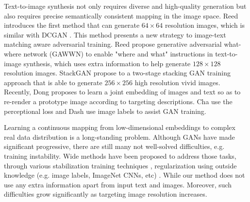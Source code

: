 \documentclass[10pt,twocolumn,letterpaper]{article}
\begin{document}
Text-to-image synthesis not only requires diverse and high-quality generation but also requires precise semantically consistent mapping in the image space.  Reed \etal \cite{reed2016generative} introduces the first method that can generate $64{\times}64$ resolution images, which is similar with DCGAN \cite{radford2015unsupervised}. This method presents a new strategy to image-text matching aware adversarial training. Reed \etal \cite{reed2016learning} propose generative
adversarial what-where network (GAWWN) to enable "where and what" instructions in text-to-image synthesis, which uses extra information to help generate $128{\times}128$ resolution images. StackGAN \etal \cite{han2017stackgan} propose to a two-stage stacking GAN training approach that is able to generate $256{\times}256$ high resolution vivid images. Recently, Dong \etal \cite{dong2017semantic} proposes to learn a joint embedding of images and text so as to re-render a prototype image according to targeting descriptions. Cha \etal \cite{dash2017tac} use the perceptional loss and Dash \etal \cite{dash2017tac} use image labels to assist GAN training. 
	
Learning a continuous mapping from low-dimensional embeddings to complex real data distribution is a long-standing problem. Although GANs have made significant progressive, there are still many not well-solved difficulties, e.g. training instability. Wide methods have been proposed to address those tasks, through various stabilization training techniques \cite{salimans2016improved,arjovsky2017wasserstein,berthelot2017began,shrivastava2016learning,odena2016conditional}, regularization using outside knowledge (e.g. image labels, ImageNet CNNs, etc) \cite{dosovitskiy2016generating,ledig2016photo,dash2017tac,dash2017tac}. While our method does not use any extra information apart from input text and images. Moreover, such difficulties grow significantly as targeting image resolution increases.

\end{document}
